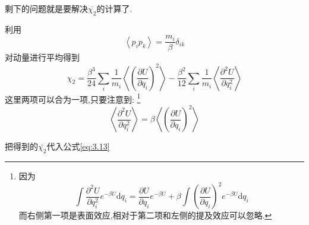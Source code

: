 \vspace*{0.5cm}

剩下的问题就是要解决$\bar{\chi_2}$的计算了.

利用 
\[\left< p_i p_k \right> =\dfrac{m_i}{\beta}\delta_{ik}\]
对动量进行平均得到
\begin{equation}
  \chi_2=\dfrac{\beta^{3}}{24}\sum_i \frac{1}{m_i}\left< \left( \dfrac{\partial U}{\partial q_i} \right) ^{2} \right> -\dfrac{\beta^{2}}{12}\sum_i \frac{1}{m_i}\left< \frac{\partial^2 U}{\partial q_i^2} \right> 
\end{equation}
这里两项可以合为一项,只要注意到:
\footnote{因为 
\[\int \frac{\partial^2 U}{\partial q_i^2}e^{-\beta U}\mathrm{d} q_i=\dfrac{\partial U}{\partial q_i}e^{-\beta U}+\beta\int\left( \dfrac{\partial U}{\partial q_i} \right) ^{2}e^{-\beta U}\mathrm{d}  q_i\]
而右侧第一项是表面效应,相对于第二项和左侧的提及效应可以忽略.}
\[\left< \frac{\partial^2 U}{\partial q_i^2} \right> =\beta \left< \left( \dfrac{\partial U}{\partial q_i} \right) ^{2} \right> \]

把得到的$\bar{\chi_2}$代入公式\eqref{eq:3.13}


